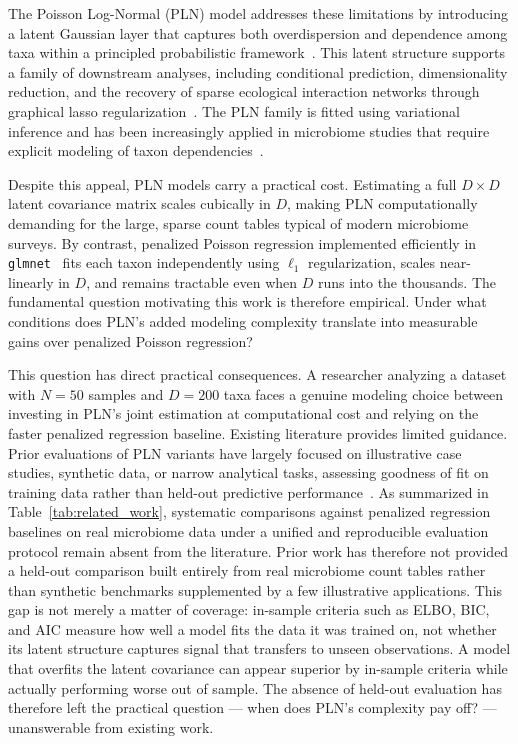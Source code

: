 \documentclass[Review,doublespace,sageh,times]{sagej}
\begin{document}
The Poisson Log-Normal (PLN) model addresses these limitations by introducing a latent Gaussian layer that captures both overdispersion and dependence among taxa within a principled probabilistic framework~\citep{aitchison1989multivariate, Chiquet2021}.
This latent structure supports a family of downstream analyses, including conditional prediction, dimensionality reduction, and the recovery of sparse ecological interaction networks through graphical lasso regularization~\citep{chiquet2019variational}.
The PLN family is fitted using variational inference and has been increasingly applied in microbiome studies that require explicit modeling of taxon dependencies~\citep{Chiquet2021, Subedi2025}.

Despite this appeal, PLN models carry a practical cost.
Estimating a full $D \times D$ latent covariance matrix scales cubically in $D$, making PLN computationally demanding for the large, sparse count tables typical of modern microbiome surveys.
By contrast, penalized Poisson regression implemented efficiently in \texttt{glmnet}~\citep{Friedman2010} fits each taxon independently using $\ell_1$ regularization, scales near-linearly in $D$, and remains tractable even when $D$ runs into the thousands.
The fundamental question motivating this work is therefore empirical.
Under what conditions does PLN's added modeling complexity translate into measurable gains over penalized Poisson regression?

This question has direct practical consequences.
A researcher analyzing a dataset with $N = 50$ samples and $D = 200$ taxa faces a genuine modeling choice between investing in PLN's joint estimation at computational cost and relying on the faster penalized regression baseline.
Existing literature provides limited guidance.
Prior evaluations of PLN variants have largely focused on illustrative case studies, synthetic data, or narrow analytical tasks, assessing goodness of fit on training data rather than held-out predictive performance~\citep{Chiquet2021, Batardiere2025ZIPLN, Chaussard2025PLNTree}.
As summarized in Table~\ref{tab:related_work}, systematic comparisons against penalized regression baselines on real microbiome data under a unified and reproducible evaluation protocol remain absent from the literature.
Prior work has therefore not provided a held-out comparison built entirely from real microbiome count tables rather than synthetic benchmarks supplemented by a few illustrative applications.
This gap is not merely a matter of coverage: in-sample criteria such as ELBO, BIC, and AIC measure how well a model fits the data it was trained on, not whether its latent structure captures signal that transfers to unseen observations.
A model that overfits the latent covariance can appear superior by in-sample criteria while actually performing worse out of sample.
The absence of held-out evaluation has therefore left the practical question --- when does PLN's complexity pay off? --- unanswerable from existing work.
\end{document}
